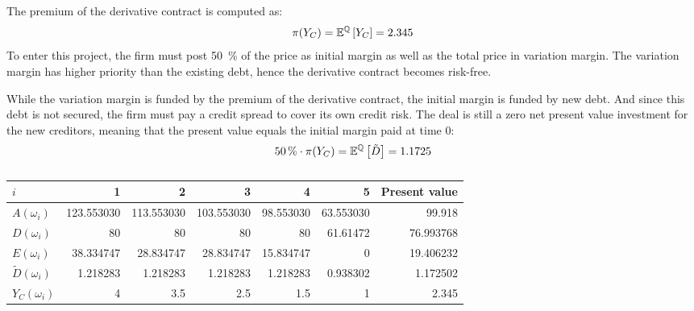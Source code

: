 \documentclass[../main.tex]{subfiles}
\begin{document}
        The premium of the derivative contract is computed as:
        \begin{equation}
            \pi(Y_C) = \mathbb{E}^{\mathbb{Q}}\left[Y_{C}\right] = \num{2.345}
        \end{equation}
        To enter this project, the firm must post \qty[round-precision=0]{50}{\percent}
        of the price as initial margin as well as the total price in variation margin.
        The variation margin has higher priority than the existing debt, hence the derivative contract becomes risk-free.

        While the variation margin is funded by the premium of the derivative contract, the initial margin is funded by new debt. And since this debt is not secured, the firm must pay a credit spread to cover its own credit risk. The deal is still a zero net present value investment for the new creditors, meaning that the present value equals the initial margin paid at time 0:
        \begin{equation}
            \qty[round-precision=0]{50}{\percent} 
            \cdot 
            \pi(Y_C) = \mathbb{E}^{\rnmeasure}\left[\tilde{D}\right] = \num{1.1725}
        \end{equation}

        \begin{table}[H]
            \centering
            \begin{tabular}{l|rrrrr||r}
                $i$ & 1 & 2 & 3 & 4 & 5 & Present value \\
                \hline
                $A(\omega_{i})$ & 
                    \num{123.553030} & \num{113.553030} & \num{103.553030} & \num{98.553030} & \num{63.553030} & \num{99.918} \\
                $D(\omega_{i})$ & 
                    \num{80} & \num{80} & \num{80} & \num{80} & \num{61.61472} & \num{76.993768} \\
                $E(\omega_{i})$ & 
                    \num{38.334747} & \num{28.834747} & \num{28.834747} & \num{15.834747} & \num{0} & \num{19.406232} \\
                $\tilde{D}(\omega_{i})$ & 
                    \num{1.218283} & \num{1.218283} & \num{1.218283} & \num{1.218283} & \num{0.938302} & \num{1.172502} \\
                $Y_C(\omega_{i})$ & \num{4} & \num{3.5} & \num{2.5} & \num{1.5} & \num{1} & \num{2.345} \\
            \end{tabular}
            \caption{}
            \label{tbl:example-collateralized-derivative}
        \end{table}
\end{document}
